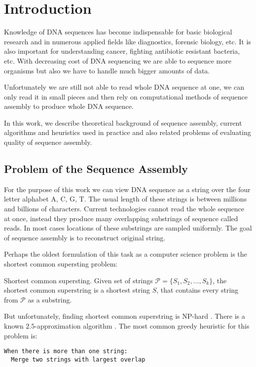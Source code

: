 \chapter{Introduction}

Knowledge of DNA sequences has become indispensable for basic biological research
and in numerous applied fields like diagnostics, forensic biology, etc.
It is also important for understanding cancer, fighting antibiotic resistant bacteria, etc.
With decreasing cost of DNA sequencing we are able to sequence more organisms
but also we have to handle much bigger amounts of data. 

Unfortunately we are still not able to read whole DNA sequence at one, we can only
read it in small pieces and then rely on computational methods of sequence assembly
to produce whole DNA sequence.

In this work, we describe theoretical background of sequence assembly,
current algorithms and heuristics used in practice and also related 
problems of evaluating quality of sequence assembly.

\section{Problem of the Sequence Assembly}

For the purpose of this work we can view DNA sequence as a string over the
four letter alphabet A, C, G, T. The usual length of these strings
is between millions and billions of characters.
Current technologies cannot read the whole sequence at once, instead they produce many
overlapping substrings of sequence called reads.
In most cases locations of these substrings are sampled uniformly.
The goal of sequence assembly is to reconstruct original string.

Perhaps the oldest formulation of this task as a computer science
problem is the shortest common supersting problem:

\begin{definition}{Shortest common supersting.}
Given set of strings $\mathcal{P} = \{S_1, S_2, \dots, S_k\}$, the shortest
common superstring is a shortest string $S$, that contains every string
from $\mathcal{P}$ as a substring.
\end{definition}

But unfortunately, finding shortest common superstring is NP-hard \citep{SCShard}.
There is a known $2.5$-approximation algorithm \citep{SCSapx}.
The most common greedy heuristic for this problem is:
\begin{verbatim}
When there is more than one string:
  Merge two strings with largest overlap
\end{verbatim}

